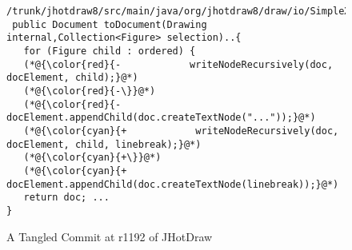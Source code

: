 \begin{figure}[t]
\begin{lstlisting}[]
 /trunk/jhotdraw8/src/main/java/org/jhotdraw8/draw/io/SimpleXmlIO.java
 public Document toDocument(Drawing internal,Collection<Figure> selection)..{
   for (Figure child : ordered) {
   (*@{\color{red}{-            writeNodeRecursively(doc, docElement, child);}@*)
   (*@{\color{red}{-\}}@*)
   (*@{\color{red}{-          docElement.appendChild(doc.createTextNode("..."));}@*)
   (*@{\color{cyan}{+            writeNodeRecursively(doc, docElement, child, linebreak);}@*)
   (*@{\color{cyan}{+\}}@*)
   (*@{\color{cyan}{+          docElement.appendChild(doc.createTextNode(linebreak));}@*)
   return doc; ...
}
	\end{lstlisting}
        \vspace{-15pt}
        \caption{A Tangled Commit at r1192 of JHotDraw}
        \label{fig:motiv-cc}
\end{figure}


